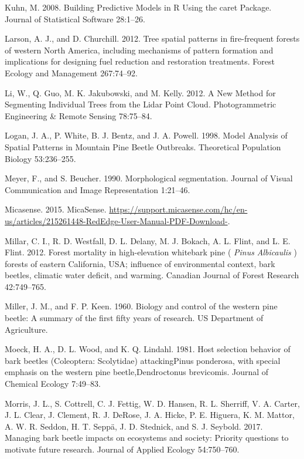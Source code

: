 \documentclass[]{article}
\begin{document}
\hypertarget{ref-kuhn2008}{}
Kuhn, M. 2008. Building Predictive Models in R Using the caret Package.
Journal of Statistical Software 28:1--26.

\hypertarget{ref-larson2012}{}
Larson, A. J., and D. Churchill. 2012. Tree spatial patterns in
fire-frequent forests of western North America, including mechanisms of
pattern formation and implications for designing fuel reduction and
restoration treatments. Forest Ecology and Management 267:74--92.

\hypertarget{ref-li2012}{}
Li, W., Q. Guo, M. K. Jakubowski, and M. Kelly. 2012. A New Method for
Segmenting Individual Trees from the Lidar Point Cloud. Photogrammetric
Engineering \& Remote Sensing 78:75--84.

\hypertarget{ref-logan1998}{}
Logan, J. A., P. White, B. J. Bentz, and J. A. Powell. 1998. Model
Analysis of Spatial Patterns in Mountain Pine Beetle Outbreaks.
Theoretical Population Biology 53:236--255.

\hypertarget{ref-meyer1990}{}
Meyer, F., and S. Beucher. 1990. Morphological segmentation. Journal of
Visual Communication and Image Representation 1:21--46.

\hypertarget{ref-micasense2015}{}
Micasense. 2015. MicaSense.
\url{https://support.micasense.com/hc/en-us/articles/215261448-RedEdge-User-Manual-PDF-Download-}.

\hypertarget{ref-millar2012}{}
Millar, C. I., R. D. Westfall, D. L. Delany, M. J. Bokach, A. L. Flint,
and L. E. Flint. 2012. Forest mortality in high-elevation whitebark pine
( \emph{Pinus} \emph{Albicaulis} ) forests of eastern California, USA;
influence of environmental context, bark beetles, climatic water
deficit, and warming. Canadian Journal of Forest Research 42:749--765.

\hypertarget{ref-miller1960}{}
Miller, J. M., and F. P. Keen. 1960. Biology and control of the western
pine beetle: A summary of the first fifty years of research. US
Department of Agriculture.

\hypertarget{ref-moeck1981}{}
Moeck, H. A., D. L. Wood, and K. Q. Lindahl. 1981. Host selection
behavior of bark beetles (Coleoptera: Scolytidae) attackingPinus
ponderosa, with special emphasis on the western pine beetle,Dendroctonus
brevicomis. Journal of Chemical Ecology 7:49--83.

\hypertarget{ref-morris2017}{}
Morris, J. L., S. Cottrell, C. J. Fettig, W. D. Hansen, R. L. Sherriff,
V. A. Carter, J. L. Clear, J. Clement, R. J. DeRose, J. A. Hicke, P. E.
Higuera, K. M. Mattor, A. W. R. Seddon, H. T. Seppä, J. D. Stednick, and
S. J. Seybold. 2017. Managing bark beetle impacts on ecosystems and
society: Priority questions to motivate future research. Journal of
Applied Ecology 54:750--760.
\end{document}
